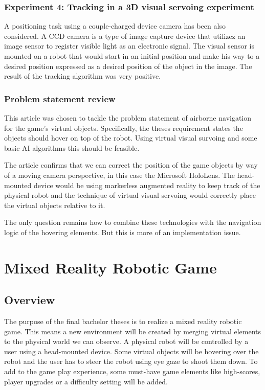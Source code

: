 \documentclass{article}
\begin{document}
\subsubsection{Experiment 4: Tracking in a 3D visual servoing experiment}
A positioning task using a couple-charged device camera has been also considered. A CCD camera  is a type of image capture device that utilizez an image sensor to register visible light as an electronic signal. The visual sensor is mounted on a robot that would start in an initial position and make his way to a desired position expressed as a desired position of the object in the image. The result of the tracking algorithm was very positive.

\subsubsection{Problem statement review}
This article was chosen to tackle the problem statement of airborne navigation for the game's virtual objects. Specifically, the theses requirement states the objects should hover on top of the robot. Using virtual visual survoing and some basic AI algorithms this should be feasible. 

The article confirms that we can correct the position of the game objects by way of a moving camera perspective, in this case the Microsoft HoloLens. The head-mounted device would be using markerless augmented reality to keep track of the physical robot and the technique of virtual visual servoing would correctly place the virtual objects relative to it. 

The only question remains how to combine these technologies with the navigation logic of the hovering elements. But this is more of an implementation issue.


\section{Mixed Reality Robotic Game}
\subsection{Overview}
The purpose of the final bachelor theses is to realize a mixed reality robotic game. This means a new environment will be created by merging virtual elements to the physical world we can observe. A physical robot will be controlled by a user using a head-mounted device. Some virtual objects will be hovering over the robot and the user has to steer the robot using eye gaze to shoot them down. To add to the game play experience, some must-have game elements like high-scores, player upgrades or a difficulty setting will be added.
\end{document}
